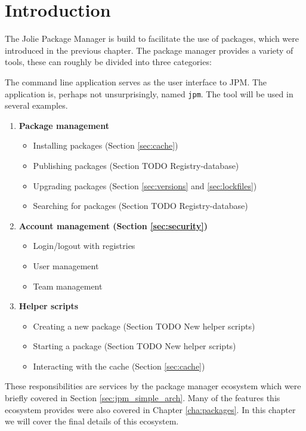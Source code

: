 \section{Introduction}

The Jolie Package Manager is build to facilitate the use of packages, which
were introduced in the previous chapter. The package manager provides a variety
of tools, these can roughly be divided into three categories:

The command line application serves as the user interface to JPM. The
application is, perhaps not unsurprisingly, named \texttt{jpm}. The
tool will be used in several examples.

\begin{enumerate}
\item \textbf{Package management}
    \begin{itemize}
        \item Installing packages (Section \ref{sec:cache})
        \item Publishing packages (Section TODO Registry-database)
        \item Upgrading packages (Section \ref{sec:versions} and
                \ref{sec:lockfiles})
        \item Searching for packages (Section TODO Registry-database)
    \end{itemize}
\item \textbf{Account management (Section \ref{sec:security})}
    \begin{itemize}
        \item Login/logout with registries
        \item User management
        \item Team management
    \end{itemize}
\item \textbf{Helper scripts}
    \begin{itemize}
        \item Creating a new package (Section TODO New helper scripts)
        \item Starting a package (Section TODO New helper scripts)
        \item Interacting with the cache (Section \ref{sec:cache})
    \end{itemize}
\end{enumerate}

These responsibilities are services by the package manager ecosystem which were
briefly covered in Section \ref{sec:jpm_simple_arch}. Many of the features this
ecosystem provides were also covered in Chapter \ref{cha:packages}. In this
chapter we will cover the final details of this ecosystem.

